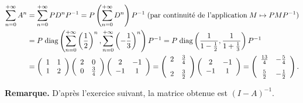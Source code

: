 {{\begin{align*}\ensuremath
\sum_{n=0}^{+\infty}A^n&=\sum_{n=0}^{+\infty}PD^nP^{-1}=P\left(\sum_{n=0}^{+\infty}D^n\right)P^{-1}\;(\text{par continuité de l'application}\;M\mapsto PMP^{-1})\\
  &=P\;\text{diag}\left(\sum_{n=0}^{+\infty}\left( \frac{1}{2}\right)^n,\sum_{n=0}^{+\infty}\left(- \frac{1}{3}\right)^n\right)P^{-1}=P\;\text{diag}\left( \frac{1}{1- \frac{1}{2}}, \frac{1}{1+ \frac{1}{3}}\right)P^{-1}\\
  &=\left(
\begin{array}{cc}
1&1\\
1&2
\end{array}
\right)\left(
\begin{array}{cc}
2&0\\
0& \frac{3}{4}
\end{array}
\right)\left(
\begin{array}{cc}
2&-1\\
-1&1
\end{array}
\right)=\left(
\begin{array}{cc}
\rule[-4mm]{0mm}{0mm}2& \frac{3}{4}\\
2& \frac{3}{2}
\end{array}
\right)\left(
\begin{array}{cc}
2&-1\\
-1&1
\end{array}
\right)=\left(
\begin{array}{cc}
\rule[-4mm]{0mm}{0mm} \frac{13}{4}&- \frac{5}{4}\\
 \frac{5}{2}&- \frac{1}{2}
\end{array}
\right).
\end{align*}

\begin{center}
\end{center}

\textbf{Remarque.} D'après l'exercice suivant, la matrice obtenue est $(I-A)^{-1}$.}
}